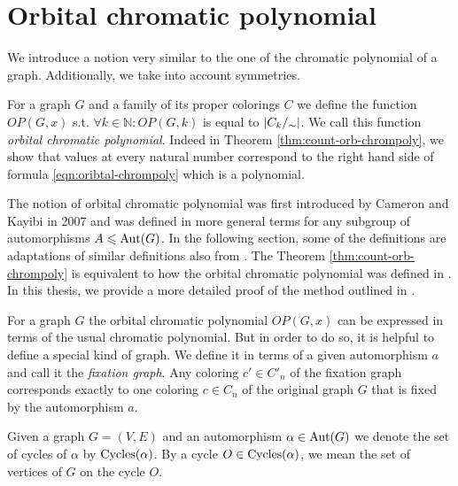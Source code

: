 \chapter{Orbital chromatic polynomial}

We introduce a notion very similar to the one of the chromatic polynomial of a graph. Additionally, we take into account symmetries.

\begin{highlight}

\begin{defn}
    For a graph $G$ and a family of its proper colorings $C$ we define the function $OP(G,x)$ s.t. $\forall k \in \mathbb{N} : OP(G,k)$ is equal to $\left|{C_k/_\sim}\right|$. We call this function \emph{orbital chromatic polynomial}. Indeed in Theorem \ref{thm:count-orb-chrompoly}, we show that values at every natural number correspond to the right hand side of formula \ref{eqn:oribtal-chrompoly} which is a polynomial.
\end{defn}

\end{highlight}

The notion of orbital chromatic polynomial was first introduced by Cameron and Kayibi \cite{caka2007} in 2007 and was defined in more general terms for any subgroup of automorphisms $A \leqslant  \operatorname{Aut}(G)$. In the following section, some of the definitions are adaptations of similar definitions also from \cite{caka2007}. The Theorem \ref{thm:count-orb-chrompoly} is equivalent to how the orbital chromatic polynomial was defined in \cite{caka2007}. In this thesis, we provide a more detailed proof of the method outlined in \cite{caka2007}. 

For a graph $G$ the orbital chromatic polynomial $OP(G,x)$ can be expressed in terms of the usual chromatic polynomial. But in order to do so, it is helpful to define a special kind of graph. We define it in terms of a given automorphism $a$ and call it the \textit{fixation graph}. Any coloring $c' \in C'_n$ of the fixation graph corresponds exactly to one coloring $c \in C_n$ of the original graph $G$ that is fixed by the automorphism $a$.

\begin{defn}
    Given a graph $G=(V,E)$ and an automorphism $\alpha \in \operatorname{Aut}(G)$ we denote the set of cycles of $\alpha$ by $\operatorname{Cycles}(\alpha)$. By a cycle $O \in \operatorname{Cycles}(\alpha)$, we mean the set of vertices of $G$ on the cycle $O$.
\end{defn}

